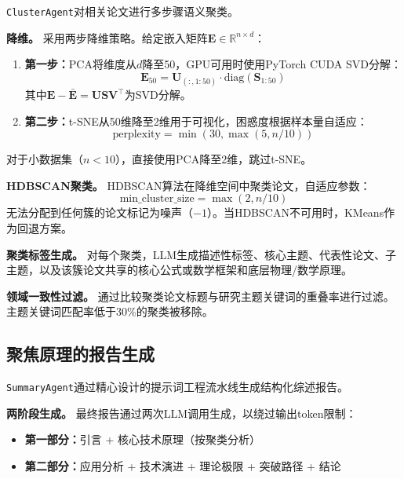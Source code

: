 \texttt{ClusterAgent}对相关论文进行多步骤语义聚类。

\textbf{降维。}
采用两步降维策略。给定嵌入矩阵$\mathbf{E} \in \mathbb{R}^{n \times d}$：
\begin{enumerate}
    \item \textbf{第一步：}PCA将维度从$d$降至50，GPU可用时使用PyTorch CUDA SVD分解：
    \begin{equation}
        \mathbf{E}_{50} = \mathbf{U}_{(:, 1:50)} \cdot \text{diag}(\mathbf{S}_{1:50})
        \label{eq:pca-reduction}
    \end{equation}
    其中$\mathbf{E} - \bar{\mathbf{E}} = \mathbf{U} \mathbf{S} \mathbf{V}^\top$为SVD分解。
    \item \textbf{第二步：}t-SNE从50维降至2维用于可视化，困惑度根据样本量自适应：
    \begin{equation}
        \text{perplexity} = \min(30, \max(5, n / 10))
        \label{eq:perplexity}
    \end{equation}
\end{enumerate}
对于小数据集（$n < 10$），直接使用PCA降至2维，跳过t-SNE。

\textbf{HDBSCAN聚类。}
HDBSCAN算法在降维空间中聚类论文，自适应参数：
\begin{equation}
    \text{min\_cluster\_size} = \max(2, n / 10)
    \label{eq:min-cluster}
\end{equation}
无法分配到任何簇的论文标记为噪声（$-1$）。当HDBSCAN不可用时，KMeans作为回退方案。

\textbf{聚类标签生成。}
对每个聚类，LLM生成描述性标签、核心主题、代表性论文、子主题，以及该簇论文共享的核心公式或数学框架和底层物理/数学原理。

\textbf{领域一致性过滤。}
通过比较聚类论文标题与研究主题关键词的重叠率进行过滤。主题关键词匹配率低于30\%的聚类被移除。

\subsection{聚焦原理的报告生成}
\label{sec:method-summary}

\texttt{SummaryAgent}通过精心设计的提示词工程流水线生成结构化综述报告。

\textbf{两阶段生成。}
最终报告通过两次LLM调用生成，以绕过输出token限制：
\begin{itemize}
    \item \textbf{第一部分：}引言 + 核心技术原理（按聚类分析）
    \item \textbf{第二部分：}应用分析 + 技术演进 + 理论极限 + 突破路径 + 结论
\end{itemize}

